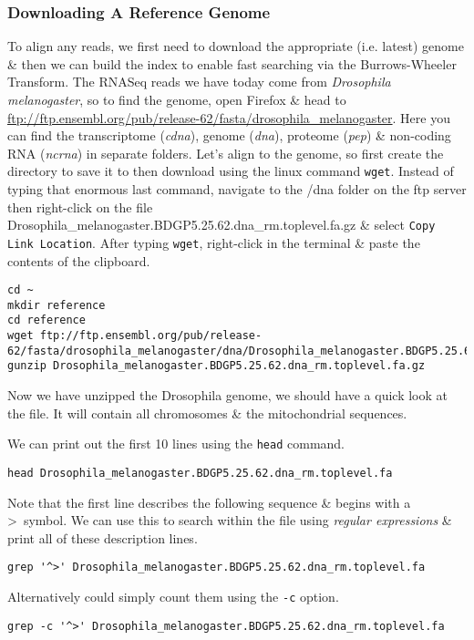 \subsubsection{Downloading A Reference Genome}
\begin{steps}
To align any reads, we first need to download the appropriate (i.e. latest) genome \& then we can build the index to enable fast searching via the Burrows-Wheeler Transform.
The RNASeq reads we have today come from \textit{Drosophila melanogaster}, so to find the genome, open Firefox \& head to \url{ftp://ftp.ensembl.org/pub/release-62/fasta/drosophila\_melanogaster}.
Here you can find the transcriptome (\textit{cdna}), genome (\textit{dna}), proteome (\textit{pep}) \& non-coding RNA (\textit{ncrna}) in separate folders.
Let's align to the genome, so first create the directory to save it to then download using the linux command \texttt{wget}.
Instead of typing that enormous last command, navigate to the /dna folder on the ftp server then right-click on the file Drosophila\_melanogaster.BDGP5.25.62.dna\_rm.toplevel.fa.gz \& select \texttt{Copy Link Location}.
After typing \texttt{wget}, right-click in the terminal \& paste the contents of the clipboard.
\begin{lstlisting}
cd ~
mkdir reference
cd reference
wget ftp://ftp.ensembl.org/pub/release-62/fasta/drosophila_melanogaster/dna/Drosophila_melanogaster.BDGP5.25.62.dna_rm.toplevel.fa.gz
gunzip Drosophila_melanogaster.BDGP5.25.62.dna_rm.toplevel.fa.gz
\end{lstlisting}
\end{steps}

\begin{information}
Now we have unzipped the Drosophila genome, we should have a quick look at the file.
It will contain all chromosomes \& the mitochondrial sequences.
\end{information}

\begin{steps}
We can print out the first 10 lines using the \texttt{head} command.
\begin{lstlisting}
head Drosophila_melanogaster.BDGP5.25.62.dna_rm.toplevel.fa    
\end{lstlisting}
Note that the first line describes the following sequence \& begins with a \textgreater ~symbol.
We can use this to search within the file using \textit{regular expressions} \& print all of these description lines.
\begin{lstlisting}
grep '^>' Drosophila_melanogaster.BDGP5.25.62.dna_rm.toplevel.fa
\end{lstlisting}
Alternatively could simply count them using the \texttt{-c} option.
\begin{lstlisting}
grep -c '^>' Drosophila_melanogaster.BDGP5.25.62.dna_rm.toplevel.fa  
\end{lstlisting}
\end{steps}

